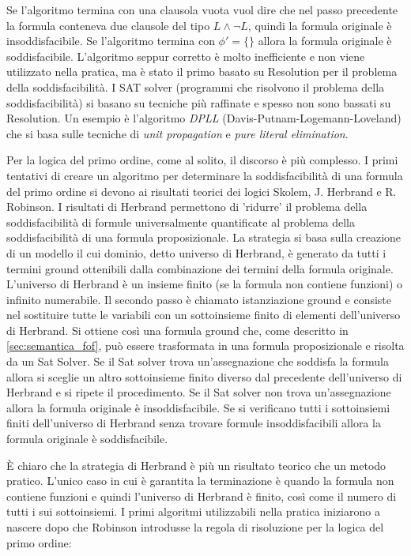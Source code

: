 \documentclass[./main.tex]{subfiles}
\begin{document}
Se l'algoritmo termina con una clausola vuota vuol dire che nel passo precedente la formula conteneva due clausole del tipo $L \land \lnot L$,
quindi la formula originale è insoddisfacibile. Se l'algoritmo termina con $\phi' = \{\}$ allora la formula originale è soddisfacibile.
L'algoritmo seppur corretto è molto inefficiente e non viene utilizzato nella pratica, 
ma è stato il primo basato su Resolution per il problema della soddisfacibilità. 
I SAT solver (programmi che risolvono il problema della soddisfacibilità) si basano su tecniche più raffinate e spesso non sono bassati su Resolution.
Un esempio è l'algoritmo \textit{DPLL} (Davis-Putnam-Logemann-Loveland) che si basa sulle tecniche di \textit{unit propagation} e \textit{pure literal elimination}.


Per la logica del primo ordine, come al solito, il discorso è più complesso.
I primi tentativi di creare un algoritmo per determinare la soddisfacibilità di una formula del primo ordine si
devono ai risultati teorici dei logici 
Skolem, J. Herbrand e R. Robinson. 
I risultati di Herbrand permettono di 'ridurre' il problema della soddisfacibilità di formule universalmente quantificate
al problema della soddisfacibilità di una formula proposizionale. La strategia si basa sulla creazione di un modello 
il cui dominio, detto universo di Herbrand, è generato da tutti i termini ground ottenibili dalla combinazione dei termini della formula originale.
L'universo di Herbrand è un insieme finito (se la formula non contiene funzioni) o infinito numerabile. Il secondo passo è 
chiamato istanziazione ground e consiste nel sostituire tutte le variabili con un sottoinsieme finito di elementi dell'universo di Herbrand.
Si ottiene così una formula ground che, come descritto in \ref{sec:semantica_fof}, può essere trasformata in una formula proposizionale e risolta da un Sat Solver. 
Se il Sat solver trova un'assegnazione che soddisfa la formula allora si sceglie un altro sottoinsieme finito diverso dal precedente dell'universo di Herbrand 
e si ripete il procedimento. Se il Sat solver non trova un'assegnazione allora la formula originale è insoddisfacibile.
Se si verificano tutti i sottoinsiemi finiti dell'universo di Herbrand senza trovare formule insoddisfacibili allora la formula originale è soddisfacibile.

È chiaro che la strategia di Herbrand è più un risultato teorico che un metodo pratico.
L'unico caso in cui è garantita la terminazione è quando la formula non contiene funzioni
e quindi l'universo di Herbrand è finito, così come il numero di tutti i sui sottoinsiemi.
I primi algoritmi utilizzabili nella pratica iniziarono a nascere dopo che Robinson introdusse la regola di risoluzione per la logica del primo ordine:
\end{document}
